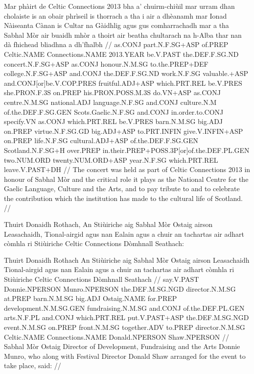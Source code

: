 \documentclass[a4paper,10pt]{article}
\begin{document}
\vspace{4mm}
\gla Mar phàirt de Celtic Connections 2013 bha a' chuirm-chiùil mar urram dhan cholaiste is an obair phrìseil is thorrach a tha i air a dhèanamh mar Ionad Nàiseanta Cànan is Cultar na Gàidhlig agus gus comharrachadh mar a tha Sabhal Mòr air buaidh mhòr a thoirt air beatha chultarach na h-Alba thar nan dà fhichead bliadhna a dh'fhalbh  //
\glb as.CONJ part.N.F.SG+ASP of.PREP Celtic.NAME Connections.NAME 2013.YEAR be.V.PAST the.DEF.F.SG.ND concert.N.F.SG+ASP as.CONJ honour.N.M.SG to.the.PREP+DEF college.N.F.SG+ASP and.CONJ the.DEF.F.SG.ND work.N.F.SG valuable.+ASP and.CONJ[or]be.V.COP.PRES fruitful.ADJ+ASP which.PRT.REL be.V.PRES she.PRON.F.3S on.PREP his.PRON.POSS.M.3S do.VN+ASP as.CONJ centre.N.M.SG national.ADJ language.N.F.SG and.CONJ culture.N.M of.the.DEF.F.SG.GEN Scots.Gaelic.N.F.SG and.CONJ in.order.to.CONJ specify.VN as.CONJ which.PRT.REL be.V.PRES barn.N.M.SG big.ADJ on.PREP virtue.N.F.SG.GD big.ADJ+ASP to.PRT.INFIN give.V.INFIN+ASP on.PREP life.N.F.SG cultural.ADJ+ASP of.the.DEF.F.SG.GEN Scotland.N.F.SG+H over.PREP in.their.PREP+POSS.3P[or]of.the.DEF.PL.GEN two.NUM.ORD twenty.NUM.ORD+ASP year.N.F.SG which.PRT.REL leave.V.PAST+DH  //
\glft The concert was held as part of Celtic Connections 2013 in honour of Sabhal Mòr and the critical role it plays as the National Centre for the Gaelic Language, Culture and the Arts, and to pay tribute to and to celebrate the contribution which the institution has made to the cultural life of Scotland. //
\endgl
\xe

\ex
\begingl
\glpre Thuirt Donaidh Rothach, An Stiùiriche aig Sabhal Mòr Ostaig airson Leasachaidh, Tional-airgid agus nan Ealain agus a chuir an tachartas air adhart còmhla ri Stiùiriche Celtic Connections Dòmhnall Seathach: 

\vspace{4mm}
\gla Thuirt Donaidh Rothach An Stiùiriche aig Sabhal Mòr Ostaig airson Leasachaidh Tional-airgid agus nan Ealain agus a chuir an tachartas air adhart còmhla ri Stiùiriche Celtic Connections Dòmhnall Seathach  //
\glb say.V.PAST Donnie.NPERSON Munro.NPERSON the.DEF.M.SG.NGD director.N.M.SG at.PREP barn.N.M.SG big.ADJ Ostaig.NAME for.PREP development.N.M.SG.GEN fundraising.N.M.SG and.CONJ of.the.DEF.PL.GEN arts.N.F.PL and.CONJ which.PRT.REL put.V.PAST+ASP the.DEF.M.SG.NGD event.N.M.SG on.PREP front.N.M.SG together.ADV to.PREP director.N.M.SG Celtic.NAME Connections.NAME Donald.NPERSON Shaw.NPERSON  //
\glft Sabhal Mòr Ostaig Director of Development, Fundraising and the Arts Donnie Munro, who along with Festival Director Donald Shaw arranged for the event to take place, said: //
\endgl
\xe
\end{document}
